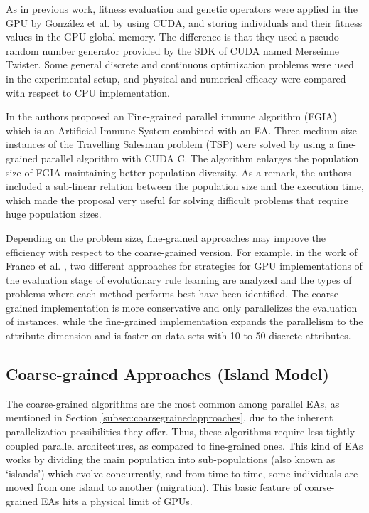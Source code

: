 \documentclass{article}
\begin{document}
As in previous work, fitness evaluation and genetic operators were applied in the GPU by Gonz\'alez et al. \cite{springerlink:10.1007978-3-642-12538-619} by using CUDA, and storing individuals and their fitness values in the GPU global memory.
The difference is that they used a pseudo random number generator provided by the SDK of CUDA named Merseinne Twister. Some general discrete and continuous optimization problems were used in the experimental setup, and physical and numerical efficacy were compared with respect to CPU implementation.

In \cite{Li:2009:PIA:1726585.1726930} the authors proposed an Fine-grained parallel immune algorithm (FGIA) which is an Artificial Immune System combined with an EA. Three medium-size instances of the Travelling Salesman problem (TSP) were solved by using a fine-grained parallel algorithm with CUDA C. The algorithm enlarges the population size of FGIA maintaining better population diversity. As a remark, the authors included a sub-linear relation between the population size and the execution time, which made the proposal very useful for solving difficult problems that require huge population sizes.



Depending on the problem size, fine-grained approaches may improve the
efficiency with respect to the coarse-grained version. For example, in
the work of Franco et al. \cite{Franco15LargeScale}, two different
approaches for strategies for GPU implementations of the evaluation
stage of evolutionary rule learning are analyzed and the types of
problems where each method performs best have been identified. The
coarse-grained implementation is more conservative and only
parallelizes the evaluation of instances, while the fine-grained
implementation expands the parallelism to the attribute dimension and
is faster on data sets with 10 to 50 discrete attributes.


\subsection{Coarse-grained Approaches (Island Model)}

The coarse-grained algorithms are the most common among parallel EAs, as mentioned in Section \ref{subsec:coarsegrainedapproaches}, due to the inherent parallelization possibilities they offer. Thus, these algorithms require less tightly coupled parallel architectures, as compared to fine-grained ones.
This kind of EAs works by dividing the main population into sub-populations (also known as `islands') which evolve concurrently, and from time to time, some individuals are moved from one island to another (migration).
This basic feature of coarse-grained EAs hits a physical limit of
GPUs.
\end{document}
